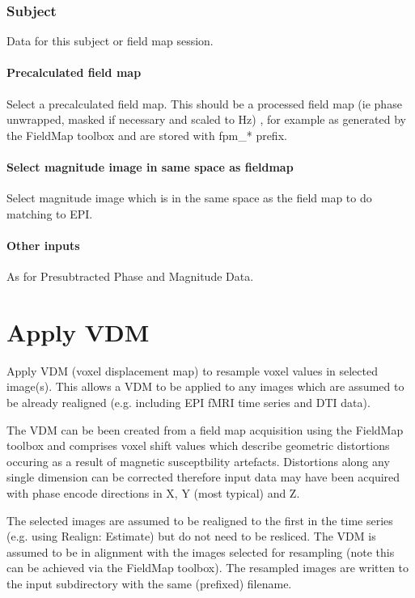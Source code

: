 \subsubsection{Subject}
Data for this subject or field map session.


\paragraph{Precalculated field map}
Select a precalculated field map. This should be a processed field map (ie phase unwrapped, masked if necessary and scaled to Hz) , for example as generated by the FieldMap toolbox and are stored with fpm\_* prefix.


\paragraph{Select magnitude image in same space as fieldmap}
Select magnitude image which is in the same space as the field map to do matching to EPI.

\paragraph{Other inputs}
As for Presubtracted Phase and Magnitude Data.

\section{Apply VDM }
Apply VDM (voxel displacement map) to resample voxel values in selected image(s). This allows a VDM to be applied to any images which are assumed to be already realigned (e.g. including EPI fMRI time series and DTI data).

The VDM can be been created from a field map acquisition using the FieldMap toolbox and comprises voxel shift values which describe geometric distortions occuring as a result of magnetic susceptbility artefacts. Distortions along any single dimension can be corrected therefore input data may have been acquired with phase encode directions in X, Y (most typical) and Z.

The selected images are assumed to be realigned to the first in the time series (e.g. using Realign: Estimate) but do not need to be resliced. The VDM is assumed to be in alignment with the images selected for resampling (note this can be achieved via the FieldMap toolbox). The resampled images are written to the input subdirectory with the same (prefixed) filename.

